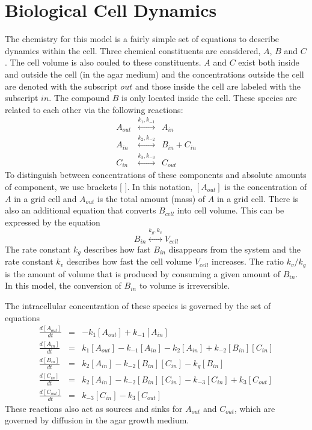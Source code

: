 \documentclass[12pt]{article}
\begin{document}
\section{Biological Cell Dynamics}
The chemistry for this model is a fairly simple set of equations to describe
dynamics within the cell. Three chemical constituents are considered, $A$, $B$
and $C$. The cell volume is also couled to these constituents. $A$ and $C$
exist both inside and outside the cell (in the
agar medium) and the concentrations outside the cell are denoted with the
subscript $out$ and those inside the cell are labeled
with the subscript $in$. The compound $B$ is only located inside the cell.
These species are related to each other via the following reactions:
\begin{eqnarray*}
A_{out} &\stackrel{k_{1},k_{-1}}{\longleftrightarrow}& A_{in} \\
A_{in} &\stackrel{k_2,k_{-2}}{\longleftrightarrow}& B_{in} + C_{in} \\
C_{in} &\stackrel{k_3,k_{-3}}{\longleftrightarrow}& C_{out}
\end{eqnarray*}
To distinguish
between concentrations of these components and absolute amounts of component, we use
brackets [ ]. In this notation, $[A_{out}]$ is the concentration of $A$ in a grid cell and
$A_{out}$ is the total amount (mass) of $A$ in a grid cell. There is also an
additional equation that converts $B_{cell}$ into cell volume. This can be
expressed by the equation
\[
B_{in} \stackrel{k_g,k_v}{\longleftrightarrow} V_{cell}
\]
The rate constant $k_g$ describes how fast $B_{in}$ disappears from the system
and the rate constant $k_v$ describes how fast the cell volume $V_{cell}$
increases. The ratio
$k_v/k_g$ is the amount of volume that is produced by consuming a given amount
of $B_{in}$. In this model, the conversion of $B_{in}$ to volume is irreversible.

The intracellular concentration of these species is governed by the set of equations
\begin{eqnarray*}
\frac{d [A_{out}]}{d t} &=&-k_1 [A_{out}]+k_{-1} [A_{in}] \\
\frac{d [A_{in}]}{d t} &=&k_1 [A_{out}]-k_{-1} [A_{in}] - k_2 [A_{in}]
 + k_{-2}[B_{in}][C_{in}]\\
\frac{d [B_{in}]}{d t} &=&k_2 [A_{in}] - k_{-2}[B_{in}][C_{in}] - k_g[B_{in}]\\
\frac{d [C_{in}]}{d t} &=&k_2 [A_{in}] - k_{-2}[B_{in}][C_{in}]-k_{-3} [C_{in}]
+ k_3 [C_{out}] \\
\frac{d [C_{out}]}{d t} &=&k_{-3} [C_{in}]-k_3 [C_{out}]
\end{eqnarray*}
These reactions also act as sources and sinks for $A_{out}$ and $C_{out}$, which are governed
by diffusion in the agar growth medium.
\end{document}

